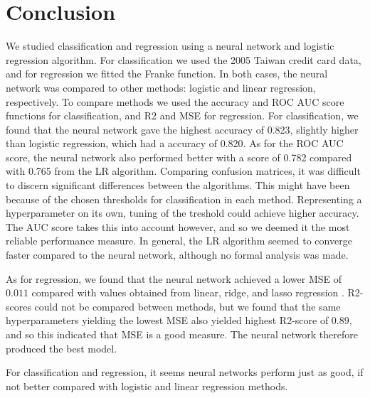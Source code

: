 \section{Conclusion}
\label{sec:conclusion}

We studied classification and regression using a neural network and logistic regression
algorithm. For classification we used the 2005 Taiwan credit card data,
and for regression we fitted the Franke function. In both cases, the neural network
was compared to other methods: logistic and linear regression, respectively.
To compare methods we used the accuracy and ROC AUC score functions for classification,
and R2 and MSE for regression. For classification, we found that the neural network gave
the highest accuracy of 0.823, slightly higher than logistic regression, which had a
accuracy of 0.820. As for the ROC AUC score, the neural network also performed better
with a score of 0.782 compared with 0.765 from the LR algorithm. Comparing confusion matrices, it was difficult to discern significant differences between the algorithms. This might have been because of the chosen thresholds for classification in each method. Representing a hyperparameter on its own, tuning of the treshold could achieve higher accuracy. The AUC score takes this into account however, and so we deemed it the most reliable performance measure. In general, the LR algorithm seemed to converge faster compared to the neural network, although no formal analysis was made.

As for regression, we found that the neural network achieved a lower MSE of $0.011$ compared
with values obtained from linear, ridge, and lasso regression \citep{prosjekt1}.
R2-scores could not be compared between methods, but we found that the same hyperparameters
yielding the lowest MSE also yielded highest R2-score of $0.89$, and so this indicated that MSE is a
good measure. The neural network therefore produced the best model.

For classification and regression, it seems neural networks perform just as good, if not better compared with logistic and linear regression methods.

